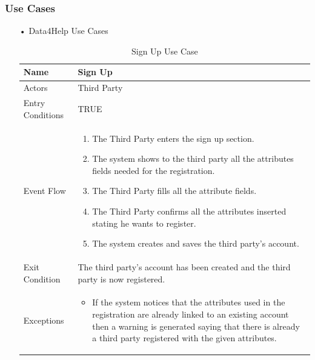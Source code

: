 \subsubsection{Use Cases}
\begin{enumerate}
\FloatBarrier
\item[•]{\Large Data4Help Use Cases}
\FloatBarrier
\begin{table}[h]
\begin{tabular}{|p{3.4cm}|p{}|}
\hline
Name             & Sign Up \\ \hline
Actors           & Third Party \\ \hline
Entry Conditions & TRUE    \\ \hline
Event Flow       & \begin{enumerate}
            \item The Third Party enters the sign up section.
            \item The system shows to the third party all the attributes fields needed for the registration.
            \item The Third Party fills all the attribute fields.
            \item The Third Party confirms all the attributes inserted stating he wants to register.
            \item The system creates and saves the third party's account.
        \end{enumerate}\\ \hline
Exit Condition   & The third party's account has been created and the third party is now registered.\\ \hline
Exceptions       & \begin{itemize}
\item If the system notices that the attributes used in the registration are already linked to an existing account then a warning is generated saying that there is already a third party registered with the given attributes.
\end{itemize}\\ \hline
\end{tabular}
\caption{Sign Up Use Case}
\end{table}
\FloatBarrier


\end{enumerate}
